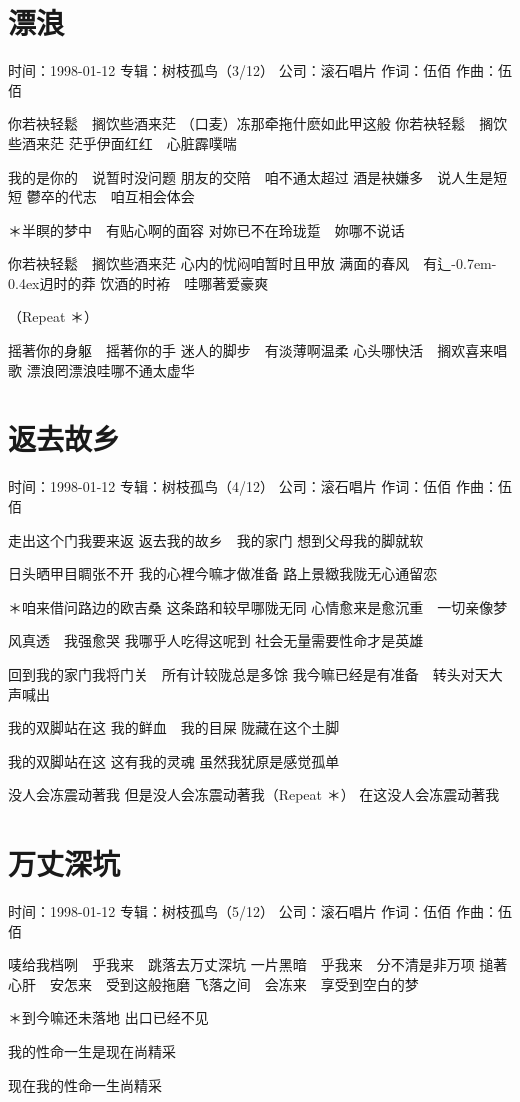 \documentclass[UTF8,a4paper,oneside,twocolumn,12pt]{ctexbook}
\newcommand{\infopair}[2]{\textbullet #1：#2}
\newcommand{\zc}[1][伍佰]{\infopair{作词}{#1}}
\newcommand{\zq}[1][伍佰]{\infopair{作曲}{#1}}
\newcommand{\zj}[1]{\infopair{专辑}{#1}}
\newcommand{\sj}[1]{\infopair{时间}{#1}}
\newcommand{\gs}[1]{\infopair{公司}{#1}}
\newcommand{\tshittho}{\hbox{辶\kern-0.7em\lower-0.4ex\hbox{\scalebox{0.7}{日}}}迌}
\newenvironment{info}{\begin{flushleft}\kaishu
	}
	{\end{flushleft}\normalsize\yahei\par}
\newenvironment{lyric}{
	}
{}
\begin{document}
\section{漂浪}
\begin{info}
	\sj{1998-01-12}
	\zj{树枝孤鸟（3/12）}
	\gs{滚石唱片}
	\zc
	\zq
\end{info}
\begin{lyric}
	你若袂轻鬆　搁饮些酒来茫
	（口麦）冻那牵拖什麽如此甲这般
	你若袂轻鬆　搁饮些酒来茫
	茫乎伊面红红　心脏霹噗喘

	我的是你的　说暂时没问题
	朋友的交陪　咱不通太超过
	酒是袂嫌多　说人生是短短
	鬱卒的代志　咱互相会体会

	＊半瞑的梦中　有贴心啊的面容
	对妳已不在玲珑踅　妳哪不说话

	你若袂轻鬆　搁饮些酒来茫
	心内的忧闷咱暂时且甲放
	满面的春风　有\tshittho{}时的莽
	饮酒的时袸　哇哪著爱豪爽

	（Repeat ＊）

	摇著你的身躯　摇著你的手
	迷人的脚步　有淡薄啊温柔
	心头哪快活　搁欢喜来唱歌
	漂浪罔漂浪哇哪不通太虚华
\end{lyric}

\section{返去故乡}
\begin{info}
	\sj{1998-01-12}
	\zj{树枝孤鸟（4/12）}
	\gs{滚石唱片}
	\zc
	\zq
\end{info}
\begin{lyric}
	走出这个门我要来返 返去我的故乡　我的家门
	想到父母我的脚就软

	日头晒甲目睭张不开 我的心裡今嘛才做准备
	路上景緻我陇无心通留恋

	＊咱来借问路边的欧吉桑 这条路和较早哪陇无同
	心情愈来是愈沉重　一切亲像梦

	风真透　我强愈哭 我哪乎人吃得这呢到
	社会无量需要性命才是英雄

	回到我的家门我将门关　所有计较陇总是多馀
	我今嘛已经是有准备　转头对天大声喊出

	我的双脚站在这 我的鲜血　我的目屎
	陇藏在这个土脚

	我的双脚站在这 这有我的灵魂
	虽然我犹原是感觉孤单

	没人会冻震动著我
	但是没人会冻震动著我（Repeat ＊）
	在这没人会冻震动著我
\end{lyric}

\section{万丈深坑}
\begin{info}
	\sj{1998-01-12}
	\zj{树枝孤鸟（5/12）}
	\gs{滚石唱片}
	\zc
	\zq
\end{info}
\begin{lyric}
	唛给我档咧　乎我来　跳落去万丈深坑
	一片黑暗　乎我来　分不清是非万项
	搥著心肝　安怎来　受到这般拖磨
	飞落之间　会冻来　享受到空白的梦

	＊到今嘛还未落地
	出口已经不见

	我的性命一生是现在尚精采

	现在我的性命一生尚精采
\end{lyric}
\end{document}
